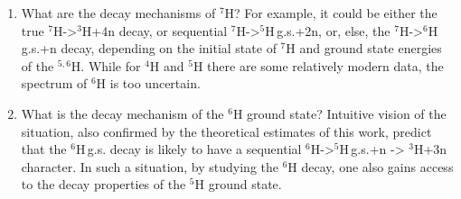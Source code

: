 \renewcommand{\labelenumi}{\roman{enumi}}
\begin{enumerate}
	\item 
	What are the decay mechanisms of $^{7}$H? 
	For example, it could be either the true $^{7}$H->$^{3}$H+4n decay, or sequential $^{7}$H->$^{5}$H\,g.s.+2n, or, else, the $^{7}$H->$^{6}$H\,g.s.+n decay, depending on the initial state of $^{7}$H and ground state energies of the $^{5,6}$H. 
	While for $^{4}$H and $^{5}$H there are some relatively modern data, the spectrum of $^{6}$H is too uncertain.
	\item 
	What is the decay mechanism of the $^{6}$H ground state?
	Intuitive vision of the situation, also confirmed by the theoretical estimates of this work, predict that the $^{6}$H\,g.s. decay is likely to have a sequential $^{6}$H->$^{5}$H\,g.s.+n -> $^{3}$H+3n character. 
	In such a situation, by studying the $^{6}$H decay, one also gains access to the decay properties of the $^{5}$H ground state.
\end{enumerate}
